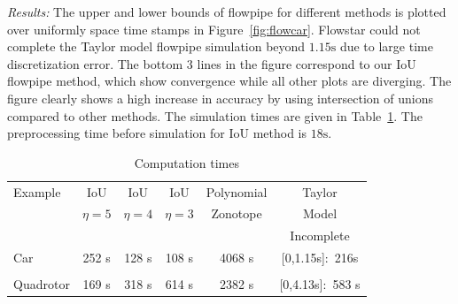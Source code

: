 \emph{Results:}  The upper and lower bounds of flowpipe for different
  methods is plotted over uniformly space time stamps in
  Figure~\ref{fig:flowcar}.  Flowstar could not complete the Taylor
  model flowpipe simulation beyond $1.15\si{\second}$ due to large
  time discretization error.  The bottom 3 lines in the figure
  correspond to our IoU flowpipe method, which show convergence while
  all other plots are diverging.  The figure clearly shows a high
  increase in accuracy by using intersection of unions compared to
  other methods.  The simulation times are given in
  Table~\ref{tab:comptimes}.  The preprocessing time before simulation
  for IoU method is $18\si{\second}$.
\begin{table}
\begin{center}
\caption{Computation times }\label{tab:comptimes}
\begin{tabular}{|l|c|c|c|c|c|}
\hline
Example & IoU  & IoU  & IoU  &
Polynomial & Taylor\\
& $\eta = 5$ & $\eta = 4$ & $\eta = 3$ & Zonotope & Model \\
\hline
& & & & & {\color{red}Incomplete}\\
Car & 252 s & 128 s & 108 s & 4068 s& {\color{red}[0,1.15s]:~216s}\\
\hline
& & & & &\\
Quadrotor & 169 s & 318 s & 614 s & 2382 s &
{\color{red}[0,4.13s]:~583 s} \\
\hline
\end{tabular}
\end{center}
\end{table}
%
